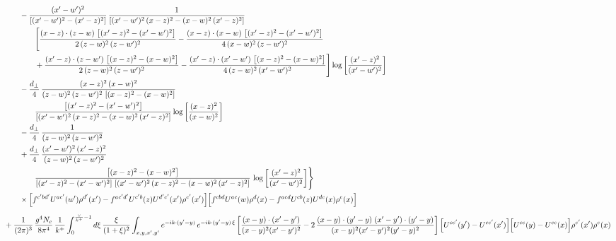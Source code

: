 \documentclass[10pt]{article}
\numberwithin{equation}{section}
\begin{document}
\begin{align}
&\qquad-\frac{(x^{\prime}-w^{\prime})^{2}}{\left[(x^{\prime}-w^{\prime})^{2}-(x^{\prime}-z)^{2}\right]}\, \frac{1}{\left[(x^{\prime}-w^{\prime})^{2}\, (x-z)^{2} - (x-w)^{2}\, (x^{\prime}-z)^{2}\right]}  \notag\\&\qquad\qquad  \Bigg[\frac{(x-z)\cdot (z-w)\, \left[(x^{\prime}-z)^{2}-(x^{\prime}-w^{\prime})^{2}\right]}{2\, (z-w)^{2}\, (z-w^{\prime})^{2}}  - \frac{(x-z)\cdot (x-w)\,\left[(x^{\prime}-z)^{2}-(x^{\prime}-w^{\prime})^{2}\right] }{4\,(x-w)^{2}\,(z-w^{\prime})^{2}}\notag\\&\qquad\qquad  +\frac{(x^{\prime}-z)\cdot (z-w^{\prime})\, \left[(x-z)^{2}-(x-w)^{2}\right]}{2\, (z-w)^{2}\, (z-w^{\prime})^{2}}-\frac{(x^{\prime}-z)\cdot (x^{\prime}-w^{\prime})\, \left[(x-z)^{2}-(x-w)^{2}\right]}{4\, (z-w)^{2}\,(x^{\prime}-w^{\prime})^{2}}\Bigg] \log{\left[\frac{(x^{\prime}-z)^{2}}{(x^{\prime}-w^{\prime})^{2}}\right]}\notag\\
&\qquad-\frac{d_{\perp}}{4}\,\frac{(x-z)^{2}\, (x-w)^{2}}{(z-w)^{2}\, (z-w^{\prime})^{2}\,\left[(x-z)^{2} - (x-w)^{2}\right]}\notag\\&\qquad\qquad  \frac{\left[(x^{\prime}-z)^{2}-(x^{\prime}-w^{\prime})^{2}\right]}{\left[(x^{\prime}-w^{\prime})^{2}\, (x-z)^{2} - (x-w)^{2}\, (x^{\prime}-z)^{2}\right]} \log{\left[\frac{(x-z)^{2}}{(x-w)^{2}}\right]}\notag\\
&\qquad-\frac{d_{\perp}}{4}\,\frac{1}{(z-w)^{2}\, (z-w^{\prime})^{2}}\notag\\
&\qquad+\frac{d_{\perp}}{4}\,\frac{(x^{\prime}-w^{\prime})^{2}\, (x^{\prime}-z)^{2}}{(z-w)^{2}\, (z-w^{\prime})^{2}}\notag\\&\qquad\qquad  \frac{\left[(x-z)^{2} - (x-w)^{2}\right]}{\left[(x^{\prime}-z)^{2} - (x^{\prime}-w^{\prime})^{2}\right]\, \left[(x^{\prime}-w^{\prime})^{2}\, (x - z)^{2} - (x-w)^{2}\,(x^{\prime}-z)^{2}\right]}\, \log{\left[\frac{(x^{\prime}-z)^{2}}{(x^{\prime}-w^{\prime})^{2}}\right]}\Bigg\}\notag\\&\qquad\times\Big[f^{c^{\prime}bd^{\prime}}U^{ac^{\prime}}(w^{\prime})\rho^{d^{\prime}}(x^{\prime})-f^{ac^{\prime}d^{\prime}}U^{c^{\prime}b}(z)U^{d^{\prime}e^{\prime}}(x^{\prime})\rho^{e^{\prime}}(x^{\prime})\Big]\Big[f^{cbd}U^{ac}(w)\rho^{d}(x)-f^{acd}U^{cb}(z)U^{de}(x)\rho^{e}(x)\Big]\notag\\[6pt]
&+\frac{1}{(2\pi)^{3}}\,\frac{g^{4}N_{c}}{8\pi^{4}}\,\frac{1}{k^{+}}\int_{0}^{\frac{\vee}{k^{+}}-1}d\xi\,\frac{\xi}{(1+\xi)^{2}}\int_{x,y,x^{\prime},y^{\prime}}e^{-ik\cdot(y^{\prime}-y)}\,e^{-ik\cdot(y^{\prime}-y)\,\xi}\,\bigg[\frac{(x-y)\cdot(x^{\prime}-y^{\prime})}{(x-y)^{2}(x^{\prime}-y^{\prime})^{2}}-2\,\frac{(x-y)\cdot(y^{\prime}-y)\;(x^{\prime}-y^{\prime})\cdot(y^{\prime}-y)}{(x-y)^{2}(x^{\prime}-y^{\prime})^{2}(y^{\prime}-y)^{2}}\bigg]\,\Big[U^{ce^{\prime}}(y^{\prime})-U^{ce^{\prime}}(x^{\prime})\Big]\Big[U^{ce}(y)-U^{ce}(x)\Big]\rho^{e^{\prime}}(x^{\prime})\rho^{e}(x)
\end{align}
\end{document}
